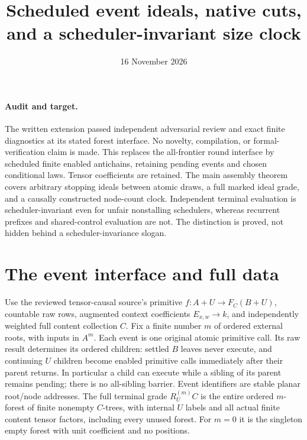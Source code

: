 \documentclass[11pt]{article}
\title{Scheduled event ideals, native cuts, and a scheduler-invariant size clock}
\date{16 November 2026}
\begin{document}
\maketitle
\paragraph{Audit and target.} The written extension passed independent adversarial review and exact finite diagnostics at its stated forest interface. No novelty, compilation, or formal-verification claim is made. This replaces the all-frontier round interface by scheduled finite enabled antichains, retaining pending events and chosen conditional laws. Tensor coefficients are retained. The main assembly theorem covers arbitrary stopping ideals between atomic draws, a full marked ideal grade, and a causally constructed node-count clock. Independent terminal evaluation is scheduler-invariant even for unfair nonstalling schedulers, whereas recurrent prefixes and shared-control evaluation are not. The distinction is proved, not hidden behind a scheduler-invariance slogan.

\section{The event interface and full data}
Use the reviewed tensor-causal source's primitive $f:A+U\to F_C(B+U)$, countable raw rows, augmented context coefficients $E_{x,w}\to k$, and independently weighted full content collection $C$. Fix a finite number $m$ of ordered external roots, with inputs in $A^m$. Each event is one original atomic primitive call. Its raw result determines its ordered children: settled $B$ leaves never execute, and continuing $U$ children become enabled primitive calls immediately after their parent returns. In particular a child can execute while a sibling of its parent remains pending; there is no all-sibling barrier. Event identifiers are stable planar root/node addresses. The full terminal grade $R_U^{(m)}C$ is the entire ordered $m$-forest of finite nonempty $C$-trees, with internal $U$ labels and all actual finite content tensor factors, including every unused forest. For $m=0$ it is the singleton empty forest with unit coefficient and no positions.
\end{document}
